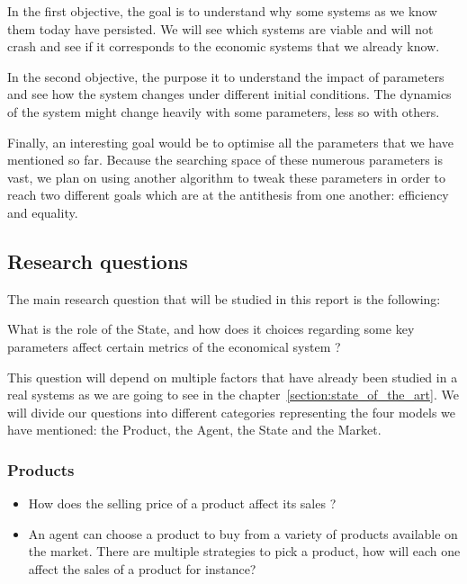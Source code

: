In the first objective, the goal is to understand why some systems as we know them today have persisted. We will see which systems are viable and will not crash and see if it corresponds to the economic systems that we already know.

In the second objective, the purpose it to understand the impact of parameters and see how the system changes under different initial conditions. The dynamics of the system might change heavily with some parameters, less so with others.

Finally, an interesting goal would be to optimise all the parameters that we have mentioned so far. Because the searching space of these numerous parameters is vast, we plan on using another algorithm to tweak these parameters in order to reach two different goals which are at the antithesis from one another: efficiency and equality. 

\subsection{Research questions}

The main research question that will be studied in this report is the following:

\vspace*{0.5cm}

\begin{center}
    What is the role of the State, and how does it choices regarding some key parameters affect certain metrics of the economical system ?
\end{center}

\vspace*{0.5cm}

This question will depend on multiple factors that have already been studied in a real systems as we are going to see in the  chapter~\ref{section:state_of_the_art}. We will divide our questions into different categories representing the four models we have mentioned: the Product, the Agent, the State and the Market. 

\subsubsection{Products}

\begin{itemize}
    \item How does the selling price of a product affect its sales ?
    \item An agent can choose a product to buy from a variety of products available on the market. There are multiple strategies to pick a product, how will each one affect the sales of a product for instance?
\end{itemize}


